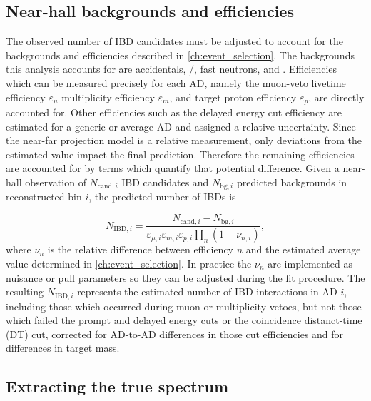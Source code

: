 \subsection{Near-hall backgrounds and efficiencies}
\label{subsec:near_bg_eff}

The observed number of IBD candidates must be adjusted
to account for the backgrounds and efficiencies described in \cref{ch:event_selection}.
The backgrounds this analysis accounts for are
accidentals, \li{}/\he{}, fast neutrons, and \amc{}.
Efficiencies which can be measured precisely for each AD,
namely
the muon-veto livetime efficiency $\varepsilon_\mu$
multiplicity efficiency $\varepsilon_m$,
and target proton efficiency $\varepsilon_p$,
are directly accounted for.
Other efficiencies such as the delayed energy cut efficiency
are estimated for a generic or average AD and assigned a relative uncertainty.
Since the near-far projection model is a relative measurement,
only deviations from the estimated value
impact the final prediction.
Therefore the remaining efficiencies are accounted for
by terms which quantify that potential difference.
Given a near-hall observation of $N_{\text{cand},i}$ IBD candidates
and $N_{\text{bg},i}$ predicted backgrounds in reconstructed bin $i$,
the predicted number of IBDs is

\begin{equation}\label{eq:near_hall_bg_eff}
    N_{\text{IBD},i} =
    \frac{N_{\text{cand},i} - N_{\text{bg},i}}{
        \varepsilon_{\mu,i}\varepsilon_{m,i}\varepsilon_{p,i}\prod_n(1+\nu_{n,i})
    },
\end{equation}
where $\nu_n$ is the relative difference between efficiency $n$
and the estimated average value determined in \cref{ch:event_selection}.
In practice the $\nu_n$ are implemented as nuisance or pull parameters
so they can be adjusted during the fit procedure.
The resulting $N_{\text{IBD},i}$ represents
the estimated number of IBD interactions in AD $i$,
including those which occurred during muon or multiplicity vetoes,
but not those which failed the prompt and delayed energy cuts
or the coincidence distanct-time (DT) cut,
corrected for AD-to-AD differences in those cut efficiencies
and for differences in target mass.


\subsection{Extracting the true \texorpdfstring{\nuebar{}}{antineutrino} spectrum}
\label{subsec:reco_to_true_energy}

